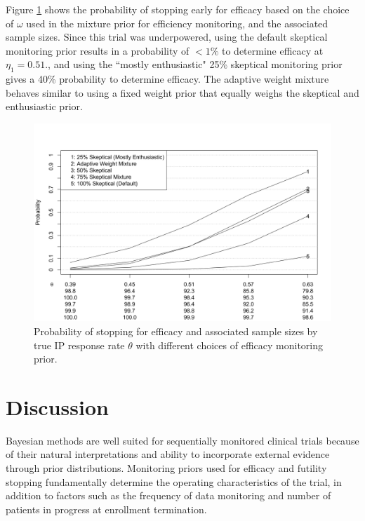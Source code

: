 \documentclass[useAMS,usenatbib,referee]{biom}
\begin{document}
Figure \ref{fig:ex2varyomega} shows the probability of stopping early for efficacy based on the choice of $\omega$ used in the mixture prior for efficiency monitoring, and the associated sample sizes. Since this trial was underpowered, using the default skeptical monitoring prior results in a probability of $<1\%$ to determine efficacy at $\eta_1=0.51$., and using the ``mostly enthusiastic" 25\% skeptical monitoring prior gives a 40\% probability to determine efficacy. The adaptive weight mixture behaves similar to using a fixed weight prior that equally weighs the skeptical and enthusiastic prior.

\begin{figure}\begin{center}
   \includegraphics[width=6in]{figure6.png}
    \caption{Probability of stopping for efficacy and associated sample sizes by true IP response rate $\theta$ with different choices of efficacy monitoring prior.}
\label{fig:ex2varyomega}
 \end{center}
\end{figure}
\section{Discussion}
Bayesian methods are well suited for sequentially monitored clinical trials because of their natural interpretations and ability to incorporate external evidence through prior distributions. Monitoring priors used for efficacy and futility stopping fundamentally determine the operating characteristics of the trial, in addition to factors such as the frequency of data monitoring and number of patients in progress at enrollment termination. 
\end{document}
